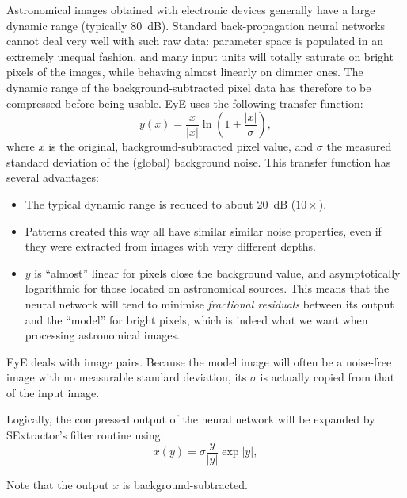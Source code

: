 \documentclass[11pt,titlepage]{article}
\begin{document}
Astronomical images obtained with electronic devices generally have a large dynamic range (typically 80~dB).
Standard back-propagation neural networks cannot deal very well with such raw data: parameter space is populated in an extremely
unequal fashion, and many input units will totally saturate on bright pixels of the images, while behaving almost linearly on
dimmer ones. The dynamic range of the background-subtracted pixel data has therefore to be compressed before being usable.
{\sc EyE} uses the following transfer function:
\begin{equation}
y(x) = \frac{x}{|x|} \ln \left( 1 + \frac{|x|}{\sigma} \right) ,
\label{eq:compress}
\end{equation}
where $x$ is the original, background-subtracted pixel value, and $\sigma$ the measured standard deviation of the (global)
background noise. This transfer function has several advantages:
\begin{itemize}
\item The typical dynamic range is reduced to about 20~dB ($10\times$).
\item Patterns created this way all have similar similar noise properties, even if they were extracted from images with very
      different depths.
\item $y$ is ``almost'' linear for pixels close the background value, and asymptotically logarithmic for those located on
      astronomical sources. This means that the neural network will tend to minimise {\em fractional residuals} between
      its output and the ``model'' for bright pixels, which is indeed what we want when processing astronomical images.
\end{itemize}
{\sc EyE} deals with image pairs. Because the model image will often be a noise-free image with no measurable standard
deviation, its $\sigma$ is actually copied from that of the input image.

Logically, the compressed output of the neural network will be expanded by SExtractor's filter routine using:
\begin{equation}
x(y) = \sigma \frac{y}{|y|} \exp |y| ,
\end{equation}

Note that the output $x$ is background-subtracted.
\end{document}
